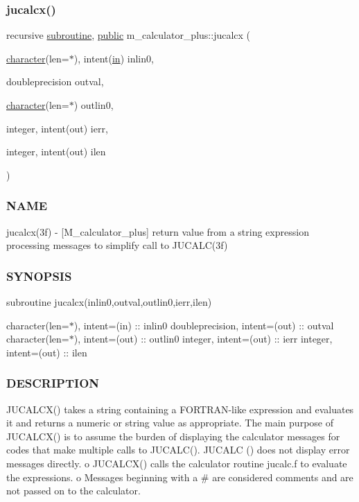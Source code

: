 \subsubsection{\texorpdfstring{jucalcx()}{jucalcx()}}
{\footnotesize\ttfamily recursive \hyperlink{M__stopwatch_83_8txt_acfbcff50169d691ff02d4a123ed70482}{subroutine}, \hyperlink{M__stopwatch_83_8txt_a2f74811300c361e53b430611a7d1769f}{public} m\+\_\+calculator\+\_\+plus\+::jucalcx (\begin{DoxyParamCaption}\item[{\hyperlink{option__stopwatch_83_8txt_abd4b21fbbd175834027b5224bfe97e66}{character}(len=$\ast$), intent(\hyperlink{M__journal_83_8txt_afce72651d1eed785a2132bee863b2f38}{in})}]{inlin0,  }\item[{doubleprecision}]{outval,  }\item[{\hyperlink{option__stopwatch_83_8txt_abd4b21fbbd175834027b5224bfe97e66}{character}(len=$\ast$)}]{outlin0,  }\item[{integer, intent(out)}]{ierr,  }\item[{integer, intent(out)}]{ilen }\end{DoxyParamCaption})}



\subsubsection*{N\+A\+ME}

jucalcx(3f) -\/ \mbox{[}M\+\_\+calculator\+\_\+plus\mbox{]} return value from a string expression processing messages to simplify call to J\+U\+C\+A\+L\+C(3f) \subsubsection*{S\+Y\+N\+O\+P\+S\+IS}

subroutine jucalcx(inlin0,outval,outlin0,ierr,ilen)

character(len=$\ast$), intent=(in) \+:\+: inlin0 doubleprecision, intent=(out) \+:\+: outval character(len=$\ast$), intent=(out) \+:\+: outlin0 integer, intent=(out) \+:\+: ierr integer, intent=(out) \+:\+: ilen

\subsubsection*{D\+E\+S\+C\+R\+I\+P\+T\+I\+ON}

J\+U\+C\+A\+L\+C\+X() takes a string containing a F\+O\+R\+T\+R\+A\+N-\/like expression and evaluates it and returns a numeric or string value as appropriate. The main purpose of J\+U\+C\+A\+L\+C\+X() is to assume the burden of displaying the calculator messages for codes that make multiple calls to J\+U\+C\+A\+L\+C(). J\+U\+C\+A\+LC () does not display error messages directly. o J\+U\+C\+A\+L\+C\+X() calls the calculator routine jucalc.\+f to evaluate the expressions. o Messages beginning with a \# are considered comments and are not passed on to the calculator.

